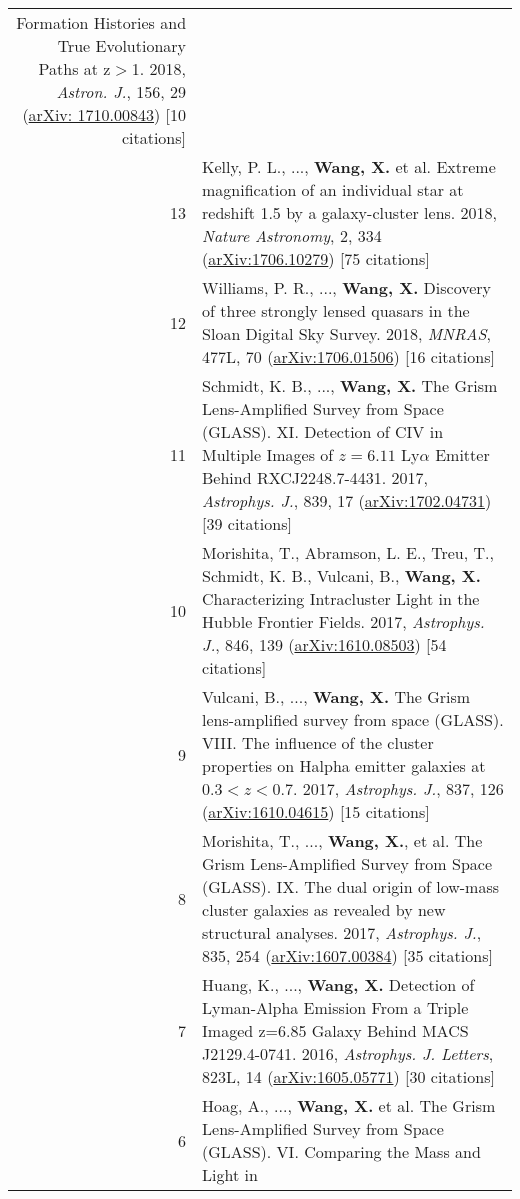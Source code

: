 \documentclass[letterpaper,10pt]{article}
\begin{document}
\begin{longtable}{rp{6.3in}}
    Formation Histories and True Evolutionary Paths at z$>$1. 2018, \textit{Astron. J.}, 156, 29 (\href{https://arxiv.org/abs/1710.00843}{arXiv:
    1710.00843}) [10 citations]  \\
13  &   Kelly, P. L., ..., \textbf{Wang, X.} et al. Extreme magnification of an individual star at redshift 1.5 by a galaxy-cluster lens. 2018, 
    \textit{Nature Astronomy}, 2, 334 (\href{https://arxiv.org/abs/1706.10279}{arXiv:1706.10279}) [75 citations]  \\
12  &   Williams, P. R., ..., \textbf{Wang, X.} Discovery of three strongly lensed quasars in the Sloan Digital Sky Survey. 2018, \textit{MNRAS}, 477L, 
    70 (\href{https://arxiv.org/abs/1706.01506}{arXiv:1706.01506}) [16 citations]  \\
11  &   Schmidt, K. B., ..., \textbf{Wang, X.} The Grism Lens-Amplified Survey from Space (GLASS). XI. Detection of CIV in Multiple Images of $z=6.11$ 
    Ly$\alpha$ Emitter Behind RXCJ2248.7-4431. 2017, \textit{Astrophys. J.}, 839, 17 
    (\href{https://arxiv.org/abs/1702.04731}{arXiv:1702.04731}) [39 citations] \\
10  &   Morishita, T., Abramson, L. E., Treu, T., Schmidt, K. B., Vulcani, B., \textbf{Wang, X.} Characterizing Intracluster Light in the Hubble 
    Frontier Fields. 2017, \textit{Astrophys. J.}, 846, 139 (\href{https://arxiv.org/abs/1610.08503}{arXiv:1610.08503}) [54 citations] \\
9   &   Vulcani, B., ..., \textbf{Wang, X.} The Grism lens-amplified survey from space (GLASS). VIII. The influence of the cluster properties on 
    Halpha emitter galaxies at $0.3<z<0.7$. 2017, \textit{Astrophys. J.}, 837, 126 (\href{https://arxiv.org/abs/1610.04615}{arXiv:1610.04615}) [15 citations]  \\
8   &   Morishita, T., ..., \textbf{Wang, X.}, et al. The Grism Lens-Amplified Survey from Space (GLASS). IX. The dual origin of low-mass cluster 
    galaxies as revealed by new structural analyses. 2017, \textit{Astrophys. J.}, 835, 254 (\href{https://arxiv.org/abs/1607.00384}{arXiv:1607.00384}) 
    [35 citations]  \\
7   &   Huang, K., ..., \textbf{Wang, X.} Detection of Lyman-Alpha Emission From a Triple Imaged z=6.85 Galaxy Behind MACS J2129.4-0741. 2016, 
    \textit{Astrophys. J. Letters}, 823L, 14 (\href{https://arxiv.org/abs/1605.05771}{arXiv:1605.05771}) [30 citations]   \\
6   &   Hoag, A., ..., \textbf{Wang, X.} et al. The Grism Lens-Amplified Survey from Space (GLASS). VI. Comparing the Mass and Light in 

\end{longtable}
\end{document}
